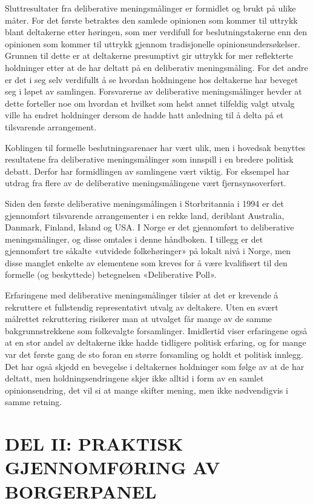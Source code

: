 \documentclass[
  12pt,
  a4paper, 12pt]{article}
\begin{document}
Sluttresultater fra deliberative meningsmålinger er formidlet og brukt på ulike måter. For det første betraktes den samlede opinionen som kommer til uttrykk blant deltakerne etter høringen, som mer verdifull for beslutningstakerne enn den opinionen som kommer til uttrykk gjennom tradisjonelle opinionsundersøkelser. Grunnen til dette er at deltakerne presumptivt gir uttrykk for mer reflekterte holdninger etter at de har deltatt på en deliberativ meningsmåling. For det andre er det i seg selv verdifullt å se hvordan holdningene hos deltakerne har beveget seg i løpet av samlingen. Forsvarerne av deliberative meningsmålinger hevder at dette forteller noe om hvordan et hvilket som helst annet tilfeldig valgt utvalg ville ha endret holdninger dersom de hadde hatt anledning til å delta på et tilsvarende arrangement.

Koblingen til formelle beslutningsarenaer har vært ulik, men i hovedsak benyttes resultatene fra deliberative meningsmålinger som innspill i en bredere politisk debatt. Derfor har formidlingen av samlingene vært viktig. For eksempel har utdrag fra flere av de deliberative meningsmålingene vært fjernsynsoverført.

Siden den første deliberative meningsmålingen i Storbritannia i 1994 er det gjennomført tilsvarende arrangementer i en rekke land, deriblant Australia, Danmark, Finland, Island og USA. I Norge er det gjennomført to deliberative meningsmålinger, og disse omtales i denne håndboken. I tillegg er det gjennomført tre såkalte «utvidede folkehøringer» på lokalt nivå i Norge, men disse manglet enkelte av elementene som kreves for å være kvalifisert til den formelle (og beskyttede) betegnelsen «Deliberative Poll».

Erfaringene med deliberative meningsmålinger tilsier at det er krevende å rekruttere et fullstendig representativt utvalg av deltakere. Uten en svært målrettet rekruttering risikerer man at utvalget får mange av de samme bakgrunnstrekkene som folkevalgte forsamlinger. Imidlertid viser erfaringene også at en stor andel av deltakerne ikke hadde tidligere politisk erfaring, og for mange var det første gang de sto foran en større forsamling og holdt et politisk innlegg. Det har også skjedd en bevegelse i deltakernes holdninger som følge av at de har deltatt, men holdningsendringene skjer ikke alltid i form av en samlet opinionsendring, det vil si at mange skifter mening, men ikke nødvendigvis i samme retning.

\newpage

\hypertarget{del-ii-praktisk-gjennomfuxf8ring-av-borgerpanel}{%
\section{DEL II: PRAKTISK GJENNOMFØRING AV BORGERPANEL}\label{del-ii-praktisk-gjennomfuxf8ring-av-borgerpanel}}
\end{document}

